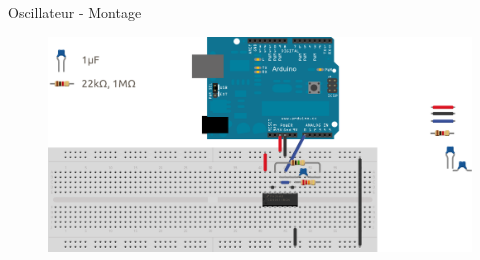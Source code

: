 \documentclass[handout]{beamer}
\begin{document}
\begin{frame}{Oscillateur - Montage}
	\begin{figure}
		\centering
		\includegraphics[width=\textwidth,height=0.9\textheight,keepaspectratio]{sysdig_clock}
	\end{figure}
\end{frame}
\end{document}
